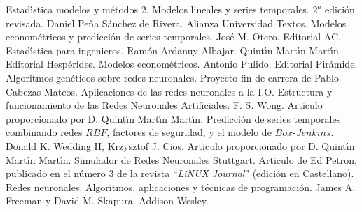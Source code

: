 %
%

\begin{thebibliography}{99}
 Estad\'{\i}stica modelos y
m\'etodos $2$. Modelos lineales y series temporales. $2^a$ edici\'on revisada. 
Daniel Pe\~na S\'anchez de Rivera. Alianza Universidad Textos.
 Modelos econom\'etricos y predicci\'on de series
temporales. Jos\'e M. Otero. Editorial AC.
 Estad\'{\i}stica para ingenieros. Ram\'on Ardanuy Albajar.
Quint\'{\i}n Mart\'{\i}n Mart\'{\i}n. Editorial Hesp\'erides.
 Modelos econom\'etricos. Antonio Pulido. Editorial
Pir\'amide.
 Algoritmos gen\'eticos sobre redes neuronales. Proyecto fin de
carrera de Pablo Cabezas Mateos.
Aplicaciones de las redes neuronales a la I.O. Estructura y
funcionamiento de las Redes Neuronales Artificiales. F. S. Wong. Articulo
proporcionado por D. Quint\'{\i}n Mart\'{\i}n Mart\'{\i}n.
Predicci\'on de series temporales combinando redes $RBF$,
factores de seguridad, y el
modelo de $Box$-$Jenkins$. Donald K. Wedding II, Krzysztof J. Cios. Articulo
proporcionado por D. Quint\'{\i}n Mart\'{\i}n Mart\'{\i}n.
 Simulador de Redes Neuronales Stuttgart. Articulo de Ed Petron, 
publicado en el n\'umero $3$ de la revista ``\emph{LiNUX Journal}'' (edici\'on
en Castellano).
 Redes neuronales. Algoritmos, aplicaciones y t\'ecnicas de
programaci\'on. James A. Freeman y David M. Skapura. Addison-Wesley.
\end{thebibliography}
